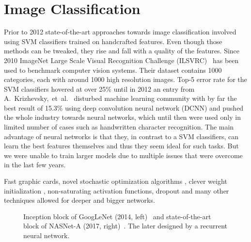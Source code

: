 \section*{Image Classification}
Prior to 2012 state-of-the-art approaches towards image classification involved using SVM classifiers trained on handcrafted features. Even though those methods can be tweaked, they rise and fall with a quality of the features. Since 2010 ImageNet Large Scale Visual Recognition Challenge (ILSVRC)~\cite{ILSVRC15} has been used to benchmark computer vision systems. Their dataset contains 1000 categories, each with around 1000 high resolution images. Top-5 error rate for the SVM classifiers hovered at over 25\% until in 2012 an entry from A.~Krizhevsky,~et~al.~\cite{AlexNet} disturbed machine learning community with by far the best result of 15.3\% using deep convolution neural network (DCNN) and pushed the whole industry towards neural networks, which until then were used only in limited number of cases such as handwritten character recognition. The main advantage of neural networks is that they, in contrast to a SVM classifiers, can learn the best features themselves and thus they seem ideal for such tasks. But we were unable to train larger models due to multiple issues that were overcome in the last few years.

Fast graphic cards, novel stochastic optimization algorithms \cite{kingma2014adam}, clever weight initialization \cite{glorot2010understanding}, non-saturating activation functions, dropout \cite{srivastava2014dropout} and many other techniques allowed for deeper and bigger networks.

\begin{figure}
	\centering

	\subfloat{
		
	}
	\hfill
	\subfloat{}

	\caption[Various advanced DCNN architectures]{Inception block of GoogLeNet (2014, left)~\cite{szegedy2015going} and state-of-the-art block of NASNet-A (2017, right)~\cite{zoph2017learning}. The later designed by a recurrent neural network.}
	\label{fig:inception_block}
\end{figure}